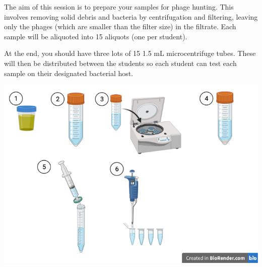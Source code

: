 \documentclass[
]{book}
\begin{document}
The aim of this session is to prepare your samples for phage hunting. This involves removing solid debris and bacteria by centrifugation and filtering, leaving only the phages (which are smaller than the filter size) in the filtrate. Each sample will be aliquoted into 15 aliquots (one per student).

At the end, you should have three lots of 15 1.5 mL microcentrifuge tubes. These will then be distributed between the students so each student can test each sample on their designated bacterial host.

\includegraphics{images/sample-preparation.png}
\end{document}
